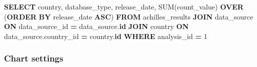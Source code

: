 \documentclass[
]{book}
\newenvironment{Shaded}{\begin{snugshade}}{\end{snugshade}}
\newcommand{\DecValTok}[1]{\textcolor[rgb]{0.00,0.00,0.81}{#1}}
\newcommand{\FunctionTok}[1]{\textcolor[rgb]{0.00,0.00,0.00}{#1}}
\newcommand{\KeywordTok}[1]{\textcolor[rgb]{0.13,0.29,0.53}{\textbf{#1}}}
\newcommand{\NormalTok}[1]{#1}
\newcommand{\OperatorTok}[1]{\textcolor[rgb]{0.81,0.36,0.00}{\textbf{#1}}}
\begin{document}
\begin{Shaded}
\begin{Highlighting}[]
\KeywordTok{SELECT}
\NormalTok{ country,}
\NormalTok{ database\_type,}
\NormalTok{ release\_date,}
 \FunctionTok{SUM}\NormalTok{(count\_value) }\KeywordTok{OVER}\NormalTok{ (}\KeywordTok{ORDER} \KeywordTok{BY}\NormalTok{ release\_date }\KeywordTok{ASC}\NormalTok{)}
\KeywordTok{FROM}\NormalTok{ achilles\_results}
\KeywordTok{JOIN}\NormalTok{ data\_source }\KeywordTok{ON}\NormalTok{ data\_source\_id }\OperatorTok{=}\NormalTok{ data\_source.}\KeywordTok{id}
\KeywordTok{JOIN}\NormalTok{ country }\KeywordTok{ON}\NormalTok{ data\_source.country\_id }\OperatorTok{=}\NormalTok{ country.}\KeywordTok{id}
\KeywordTok{WHERE}\NormalTok{ analysis\_id }\OperatorTok{=} \DecValTok{1}
\end{Highlighting}
\end{Shaded}

\hypertarget{chart-settings-1}{%
\subsubsection*{Chart settings}\label{chart-settings-1}}
\end{document}
